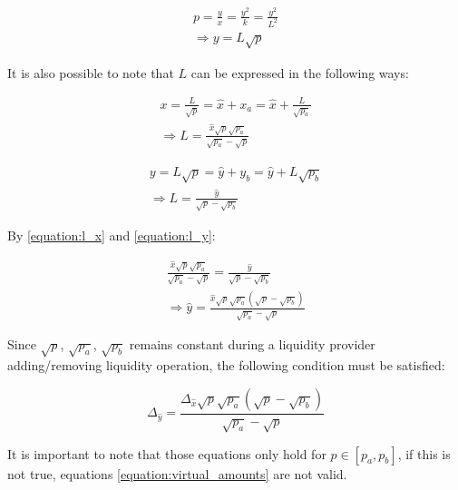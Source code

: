 \documentclass{article}
\begin{document}
\begin{equation}
\label{equation:y}
    \begin{split}
        p=\frac{y}{x}=\frac{y^2}{k}=\frac{y^2}{L^2} \\
        \Rightarrow y=L\sqrt{p}
    \end{split}
\end{equation}

It is also possible to note that $L$ can be expressed in the following ways:

\begin{equation}
    \label{equation:l_x}
    \begin{split}
        x=\frac{L}{\sqrt{p}}=\hat{x} + x_a = \hat{x} + \frac{L}{\sqrt{p_a}} \\
        \Rightarrow L=\frac{\hat{x}\sqrt{p}\sqrt{p_a}}{\sqrt{p_a} - \sqrt{p}}
    \end{split}
\end{equation}

\begin{equation}
    \label{equation:l_y}
    \begin{split}
        y=L\sqrt{p}=\hat{y} + y_b = \hat{y} + L\sqrt{p_b} \\
        \Rightarrow L=\frac{\hat{y}}{\sqrt{p} - \sqrt{p_b}}
    \end{split}
\end{equation}

By \ref{equation:l_x} and \ref{equation:l_y}:

\begin{equation}
    \label{equation:real_x_y}
    \begin{split}
        \frac{\hat{x}\sqrt{p}\sqrt{p_a}}{\sqrt{p_a} - \sqrt{p}} = \frac{\hat{y}}{\sqrt{p} - \sqrt{p_b}} \\
        \Rightarrow \hat{y}=\frac{\hat{x}\sqrt{p}\sqrt{p_a}(\sqrt{p}-\sqrt{p_b})}{\sqrt{p_a}-\sqrt{p}}
    \end{split}
\end{equation}

Since $\sqrt{p}$, $\sqrt{p_a}$, $\sqrt{p_b}$ remains constant during a liquidity provider adding/removing liquidity operation, the following condition must be satisfied:

\begin{equation}
    \Delta_{\hat{y}}=\frac{\Delta_{\hat{x}}\sqrt{p}\sqrt{p_a}(\sqrt{p}-\sqrt{p_b})}{\sqrt{p_a}-\sqrt{p}}
\end{equation}

It is important to note that those equations only hold for $p \in [p_a, p_b]$, if this is not true, equations \ref{equation:virtual_amounts} are not valid.
\end{document}
